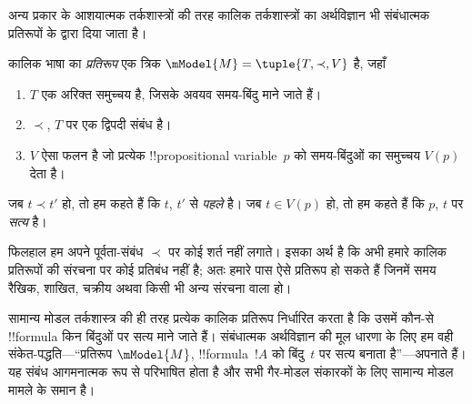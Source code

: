 \documentclass[../../../include/open-logic-section]{subfiles}
\begin{document}
अन्य प्रकार के आशयात्मक तर्कशास्त्रों की तरह कालिक तर्कशास्त्रों का अर्थविज्ञान
भी संबंधात्मक प्रतिरूपों के द्वारा दिया जाता है।

\begin{defn}
  कालिक भाषा का \emph{प्रतिरूप} एक त्रिक
  $\mModel{M} = \tuple{T, \prec, V}$ है, जहाँ
  \begin{enumerate}
  \item $T$ एक अरिक्त समुच्चय है, जिसके अवयव समय-बिंदु माने जाते हैं।
  \item $\prec$, $T$ पर एक द्विपदी संबंध है।
  \item $V$ ऐसा फलन है जो प्रत्येक !!{propositional variable}~$p$ को समय-बिंदुओं
    का समुच्चय $V(p)$ देता है।
  \end{enumerate}
  जब $t \prec t'$ हो, तो हम कहते हैं कि $t$, $t'$ से \emph{पहले} है।
  जब $t \in V(p)$ हो, तो हम कहते हैं कि $p$, $t$ पर \emph{सत्य} है।
\end{defn}

फिलहाल हम अपने पूर्वता-संबंध $\prec$ पर कोई शर्त नहीं लगाते। इसका अर्थ है
कि अभी हमारे कालिक प्रतिरूपों की संरचना पर कोई प्रतिबंध नहीं है; अतः हमारे
पास ऐसे प्रतिरूप हो सकते हैं जिनमें समय रैखिक, शाखित, चक्रीय अथवा किसी भी
अन्य संरचना वाला हो।

सामान्य मोडल तर्कशास्त्र की ही तरह प्रत्येक कालिक प्रतिरूप निर्धारित करता
है कि उसमें कौन-से !!{formula} किन बिंदुओं पर सत्य माने जाते हैं। संबंधात्मक
अर्थविज्ञान की मूल धारणा के लिए हम वही संकेत-पद्धति---``प्रतिरूप
$\mModel{M}$, !!{formula}~$!A$ को बिंदु~$t$ पर सत्य बनाता है''---अपनाते हैं।
यह संबंध आगमनात्मक रूप से परिभाषित होता है और सभी गैर-मोडल संकारकों के लिए
सामान्य मोडल मामले के समान है।
\end{document}

